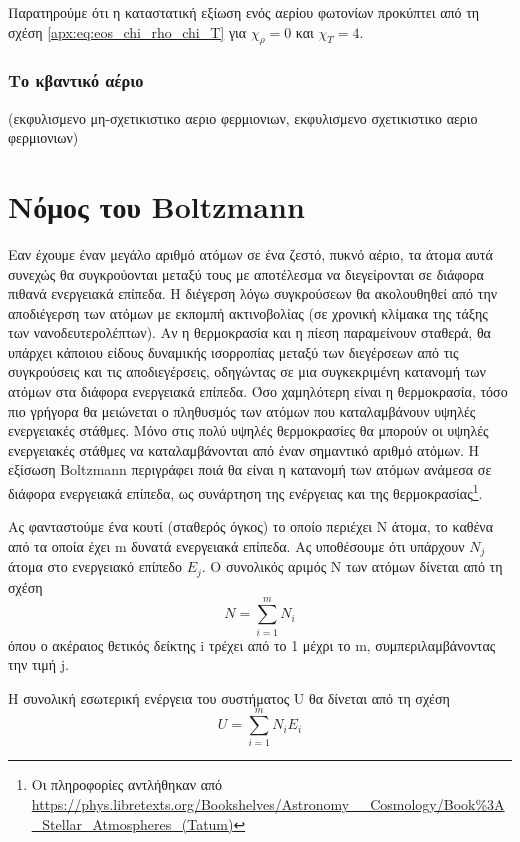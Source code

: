 Παρατηρούμε ότι η καταστατική εξίωση ενός αερίου φωτονίων προκύπτει από τη σχέση \eqref{apx:eq:eos_chi_rho_chi_T} για $\chi_\rho = 0$ και $\chi_T = 4$.



\subsubsection{Το κβαντικό αέριο}
(εκφυλισμενο μη-σχετικιστικο αεριο φερμιονιων, εκφυλισμενο σχετικιστικο αεριο φερμιονιων)





\section{Νόμος του Boltzmann}
Εαν έχουμε έναν μεγάλο αριθμό ατόμων σε ένα ζεστό, πυκνό αέριο, τα άτομα αυτά συνεχώς θα συγκρούονται μεταξύ τους με αποτέλεσμα να διεγείρονται σε διάφορα πιθανά ενεργειακά επίπεδα. Η διέγερση λόγω συγκρούσεων θα ακολουθηθεί από την αποδιέγερση των ατόμων με εκπομπή ακτινοβολίας (σε χρονική κλίμακα της τάξης των νανοδευτερολέπτων). Αν η θερμοκρασία και η πίεση παραμείνουν σταθερά, θα υπάρχει κάποιου είδους δυναμικής ισορροπίας μεταξύ των διεγέρσεων από τις συγκρούσεις και τις αποδιεγέρσεις, οδηγώντας σε μια συγκεκριμένη κατανομή των ατόμων στα διάφορα ενεργειακά επίπεδα. Όσο χαμηλότερη είναι η θερμοκρασία, τόσο πιο γρήγορα θα μειώνεται ο πληθυσμός των ατόμων που καταλαμβάνουν υψηλές ενεργειακές στάθμες. Μόνο στις πολύ υψηλές θερμοκρασίες θα μπορούν οι υψηλές ενεργειακές στάθμες να καταλαμβάνονται από έναν σημαντικό αριθμό ατόμων. Η εξίσωση Boltzmann περιγράφει ποιά θα είναι η κατανομή των ατόμων ανάμεσα σε διάφορα ενεργειακά επίπεδα, ως συνάρτηση της ενέργειας και της θερμοκρασίας\footnote{Οι πληροφορίες αντλήθηκαν από \url{https://phys.libretexts.org/Bookshelves/Astronomy__Cosmology/Book\%3A_Stellar_Atmospheres_(Tatum)}}. 

Ας φανταστούμε ένα κουτί (σταθερός όγκος) το οποίο περιέχει N άτομα, το καθένα από τα οποία έχει m δυνατά ενεργειακά επίπεδα. Ας υποθέσουμε ότι υπάρχουν $ N_j$ άτομα στο ενεργειακό επίπεδο $ E_j$. Ο συνολικός αριμός N των ατόμων δίνεται από τη σχέση
\begin{equation}
    \label{eq:apx:total_number_of_atoms}
     N = \sum_{i=1}^{m} N_i
\end{equation}
όπου ο ακέραιος θετικός δείκτης i τρέχει από το 1 μέχρι το m, συμπεριλαμβάνοντας την τιμή j.

Η συνολική εσωτερική ενέργεια του συστήματος U θα δίνεται από τη σχέση
\begin{equation}
    \label{eq:apx:internal_energy}
     U = \sum_{i=1}^{m} N_i E_i
\end{equation}

